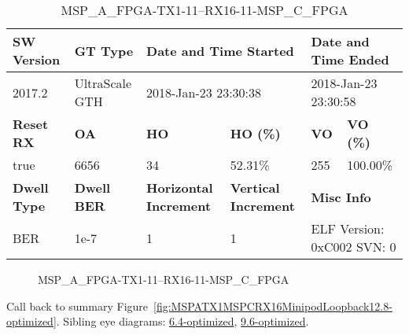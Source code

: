 \begin{table}[h]
\centering
\caption{MSP\_A\_FPGA-TX1-11--RX16-11-MSP\_C\_FPGA}
\label{tab:MSPAFPGATX111RX1611MSPCFPGA12.8-optimized}
\begin{tabular}{@{}|l|l|l|l|l|l|@{}}
\toprule
\textbf{SW Version}                & \textbf{GT Type}   & \multicolumn{2}{l|}{\textbf{Date and Time Started}}            & \multicolumn{2}{l|}{\textbf{Date and Time Ended}}        \\ \midrule
2017.2                       & UltraScale GTH          & \multicolumn{2}{l|}{2018-Jan-23 23:30:38}                   & \multicolumn{2}{l|}{2018-Jan-23 23:30:58}               \\ \midrule
\textbf{Reset RX}                  & \textbf{OA} & \textbf{HO}   & \textbf{HO (\%)} & \textbf{VO} & \textbf{VO (\%)} \\ \midrule
true & 6656        & 34          & 52.31\%        & 255        & 100.00\%       \\ \midrule
\textbf{Dwell Type}                & \textbf{Dwell BER} & \textbf{Horizontal Increment} & \textbf{Vertical Increment}    & \multicolumn{2}{l|}{\textbf{Misc Info}}                  \\ \midrule
BER                            & 1e-7        & 1        & 1           & \multicolumn{2}{l|}{ELF Version: 0xC002 SVN: 0}                         \\ \bottomrule
\end{tabular}
\end{table}

\begin{figure}[h]
\caption{MSP\_A\_FPGA-TX1-11--RX16-11-MSP\_C\_FPGA} \label{fig:MSPAFPGATX111RX1611MSPCFPGA12.8-optimized}
\end{figure}

Call back to summary Figure~\ref{fig:MSPATX1MSPCRX16MinipodLoopback12.8-optimized}.
Sibling eye diagrams: \hyperref[sec:MSPAFPGATX111RX1611MSPCFPGA6.4-optimized]{6.4-optimized}, \hyperref[sec:MSPAFPGATX111RX1611MSPCFPGA9.6-optimized]{9.6-optimized}.

\clearpage
\newpage

